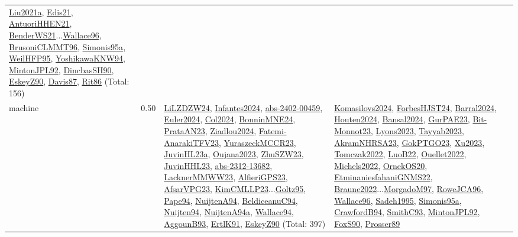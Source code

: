 {\begin{longtable}{p{3cm}r>{\raggedright\arraybackslash}p{6cm}>{\raggedright\arraybackslash}p{6cm}>{\raggedright\arraybackslash}p{8cm}}
\hyperref[detail:Liu2021a]{Liu2021a}, \hyperref[detail:Edis21]{Edis21}, \hyperref[detail:AntuoriHHEN21]{AntuoriHHEN21}, \hyperref[detail:BenderWS21]{BenderWS21}...\hyperref[detail:Wallace96]{Wallace96}, \hyperref[detail:BrusoniCLMMT96]{BrusoniCLMMT96}, \hyperref[detail:Simonis95a]{Simonis95a}, \hyperref[detail:WeilHFP95]{WeilHFP95}, \hyperref[detail:YoshikawaKNW94]{YoshikawaKNW94}, \hyperref[detail:MintonJPL92]{MintonJPL92}, \hyperref[detail:DincbasSH90]{DincbasSH90}, \hyperref[detail:EskeyZ90]{EskeyZ90}, \hyperref[detail:Davis87]{Davis87}, \hyperref[detail:Rit86]{Rit86} (Total: 156)\\
\index{machine}\index{Scheduling!machine}machine &  0.50 & \hyperref[detail:LiLZDZW24]{LiLZDZW24}, \hyperref[detail:Infantes2024]{Infantes2024}, \hyperref[detail:abs-2402-00459]{abs-2402-00459}, \hyperref[detail:Euler2024]{Euler2024}, \hyperref[detail:Col2024]{Col2024}, \hyperref[detail:BonninMNE24]{BonninMNE24}, \hyperref[detail:PrataAN23]{PrataAN23}, \hyperref[detail:Ziadlou2024]{Ziadlou2024}, \hyperref[detail:Fatemi-AnarakiTFV23]{Fatemi-AnarakiTFV23}, \hyperref[detail:YuraszeckMCCR23]{YuraszeckMCCR23}, \hyperref[detail:JuvinHL23a]{JuvinHL23a}, \hyperref[detail:Oujana2023]{Oujana2023}, \hyperref[detail:ZhuSZW23]{ZhuSZW23}, \hyperref[detail:JuvinHHL23]{JuvinHHL23}, \hyperref[detail:abs-2312-13682]{abs-2312-13682}, \hyperref[detail:LacknerMMWW23]{LacknerMMWW23}, \hyperref[detail:AlfieriGPS23]{AlfieriGPS23}, \hyperref[detail:AfsarVPG23]{AfsarVPG23}, \hyperref[detail:KimCMLLP23]{KimCMLLP23}...\hyperref[detail:Goltz95]{Goltz95}, \hyperref[detail:Pape94]{Pape94}, \hyperref[detail:NuijtenA94]{NuijtenA94}, \hyperref[detail:BeldiceanuC94]{BeldiceanuC94}, \hyperref[detail:Nuijten94]{Nuijten94}, \hyperref[detail:NuijtenA94a]{NuijtenA94a}, \hyperref[detail:Wallace94]{Wallace94}, \hyperref[detail:AggounB93]{AggounB93}, \hyperref[detail:ErtlK91]{ErtlK91}, \hyperref[detail:EskeyZ90]{EskeyZ90} (Total: 397) & \hyperref[detail:Komasilovs2024]{Komasilovs2024}, \hyperref[detail:ForbesHJST24]{ForbesHJST24}, \hyperref[detail:Barral2024]{Barral2024}, \hyperref[detail:Houten2024]{Houten2024}, \hyperref[detail:Bansal2024]{Bansal2024}, \hyperref[detail:GurPAE23]{GurPAE23}, \hyperref[detail:Bit-Monnot23]{Bit-Monnot23}, \hyperref[detail:Lyons2023]{Lyons2023}, \hyperref[detail:Tayyab2023]{Tayyab2023}, \hyperref[detail:AkramNHRSA23]{AkramNHRSA23}, \hyperref[detail:GokPTGO23]{GokPTGO23}, \hyperref[detail:Xu2023]{Xu2023}, \hyperref[detail:Tomczak2022]{Tomczak2022}, \hyperref[detail:LuoB22]{LuoB22}, \hyperref[detail:Ouellet2022]{Ouellet2022}, \hyperref[detail:Michels2022]{Michels2022}, \hyperref[detail:OrnekOS20]{OrnekOS20}, \hyperref[detail:EtminaniesfahaniGNMS22]{EtminaniesfahaniGNMS22}, \hyperref[detail:Braune2022]{Braune2022}...\hyperref[detail:MorgadoM97]{MorgadoM97}, \hyperref[detail:RoweJCA96]{RoweJCA96}, \hyperref[detail:Wallace96]{Wallace96}, \hyperref[detail:Sadeh1995]{Sadeh1995}, \hyperref[detail:Simonis95a]{Simonis95a}, \hyperref[detail:CrawfordB94]{CrawfordB94}, \hyperref[detail:SmithC93]{SmithC93}, \hyperref[detail:MintonJPL92]{MintonJPL92}, \hyperref[detail:FoxS90]{FoxS90}, \hyperref[detail:Prosser89]{Prosser89} 
\end{longtable}}
